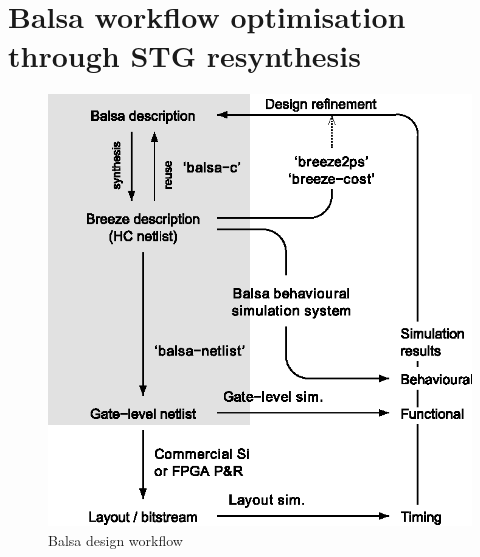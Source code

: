 \section{Balsa workflow optimisation through STG resynthesis}

\label{sec:balsa-workflow}

\begin{figure}
\centering
\includegraphics[width=0.40\paperwidth]{figures/balsa-design-workflow}

\caption{Balsa design workflow\label{fig:Balsa-design-workflow}}
\end{figure}


